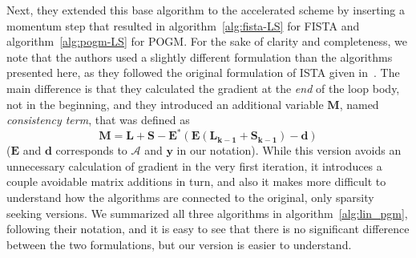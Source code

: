 Next, they extended this base algorithm to the accelerated scheme by inserting a momentum step that resulted in algorithm~\ref{alg:fista-LS} for FISTA and algorithm~\ref{alg:pogm-LS} for POGM. For the sake of clarity and completeness, we note that the authors used a slightly different formulation than the algorithms presented here, as they followed the original formulation of ISTA given in~\cite{otazo_low-rank_2015}. The main difference is that they calculated the gradient at the \textit{end} of the loop body, not in the beginning, and they introduced an additional variable $\mathbf{M}$, named \textit{consistency term}, that was defined as 
\[\mathbf{M = L + S - \mathbf{E}^*(\mathbf{E} (\mathbf{L_{k-1} + S_{k-1}}) - \mathbf{d})}\] ($\mathbf{E}$ and $\mathbf{d}$ corresponds to $\mathcal{A}$ and $\mathbf{y}$ in our notation). While this version avoids an unnecessary calculation of gradient in the very first iteration, it introduces a couple avoidable matrix additions in turn, and also it makes more difficult to understand how the algorithms are connected to the original, only sparsity seeking versions. We summarized all three algorithms in algorithm~\ref{alg:lin_pgm}, following their notation, and it is easy to see that there is no significant difference between the two formulations, but our version is easier to understand.

